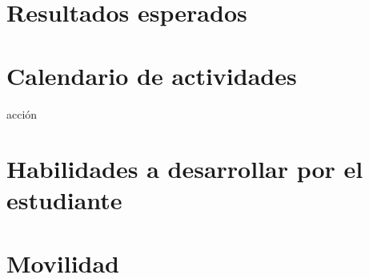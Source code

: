\documentclass[final,12p]{article}
\begin{document}
\section{Resultados esperados}

\section{Calendario de actividades}
acci\'on

\section{Habilidades a desarrollar por el estudiante}

\section{Movilidad}
\end{document}
